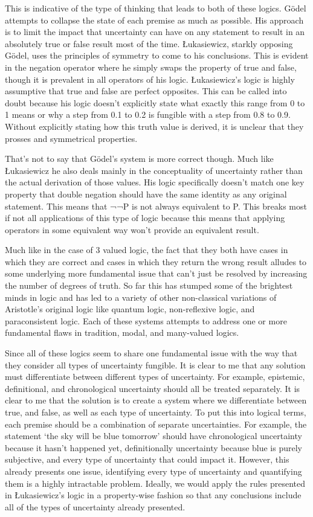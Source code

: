\documentclass{article}
\begin{document}
This is indicative of the type of thinking that leads to both of these logics. Gödel attempts to collapse the state of each premise as much as possible. His approach is to limit the impact that uncertainty can have on any statement to result in an absolutely true or false result most of the time. Łukasiewicz, starkly opposing Gödel, uses the principles of symmetry to come to his conclusions. This is evident in the negation operator where he simply swaps the property of true and false, though it is prevalent in all operators of his logic. Łukasiewicz’s logic is highly assumptive that true and false are perfect opposites. This can be called into doubt because his logic doesn’t explicitly state what exactly this range from 0 to 1 means or why a step from 0.1 to 0.2 is fungible with a step from 0.8 to 0.9. Without explicitly stating how this truth value is derived, it is unclear that they prosses and symmetrical properties. 

That’s not to say that Gödel’s system is more correct though. Much like Łukasiewicz he also deals mainly in the conceptuality of uncertainty rather than the actual derivation of those values. His logic specifically doesn’t match one key property that double negation should have the same identity as any original statement. This means that ¬¬P is not always equivalent to P. This breaks most if not all applications of this type of logic because this means that applying operators in some equivalent way won’t provide an equivalent result.

Much like in the case of 3 valued logic, the fact that they both have cases in which they are correct and cases in which they return the wrong result alludes to some underlying more fundamental issue that can’t just be resolved by increasing the number of degrees of truth. So far this has stumped some of the brightest minds in logic and has led to a variety of other non-classical variations of Aristotle’s original logic like quantum logic, non-reflexive logic, and paraconsistent logic. Each of these systems attempts to address one or more fundamental flaws in tradition, modal, and many-valued logics.

Since all of these logics seem to share one fundamental issue with the way that they consider all types of uncertainty fungible. It is clear to me that any solution must differentiate between different types of uncertainty. For example, epistemic, definitional, and chronological uncertainty should all be treated separately. It is clear to me that the solution is to create a system where we differentiate between true, and false, as well as each type of uncertainty. To put this into logical terms, each premise should be a combination of separate uncertainties. For example, the statement ‘the sky will be blue tomorrow’ should have chronological uncertainty because it hasn’t happened yet, definitionally uncertainty because blue is purely subjective, and every type of uncertainty that could impact it. However, this already presents one issue, identifying every type of uncertainty and quantifying them is a highly intractable problem. Ideally, we would apply the rules presented in Łukasiewicz’s logic in a property-wise fashion so that any conclusions include all of the types of uncertainty already presented.
\end{document}
